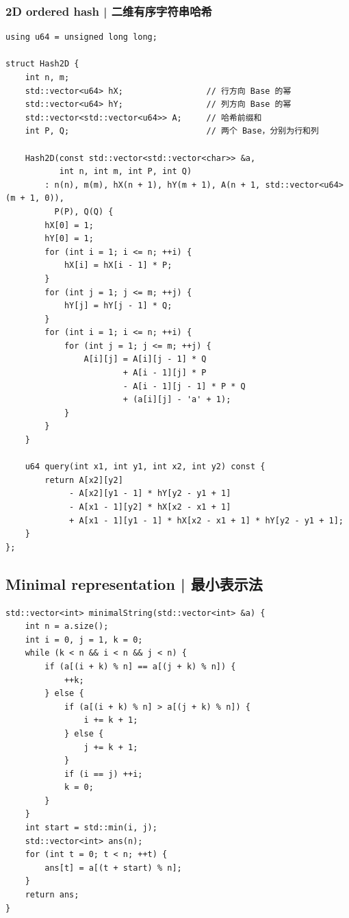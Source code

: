     \subsubsection{2D ordered hash | 二维有序字符串哈希}

        \begin{lstlisting}
using u64 = unsigned long long;

struct Hash2D {
    int n, m;
    std::vector<u64> hX;                 // 行方向 Base 的幂
    std::vector<u64> hY;                 // 列方向 Base 的幂
    std::vector<std::vector<u64>> A;     // 哈希前缀和
    int P, Q;                            // 两个 Base，分别为行和列

    Hash2D(const std::vector<std::vector<char>> &a,
           int n, int m, int P, int Q)
        : n(n), m(m), hX(n + 1), hY(m + 1), A(n + 1, std::vector<u64>(m + 1, 0)),
          P(P), Q(Q) {
        hX[0] = 1;
        hY[0] = 1;
        for (int i = 1; i <= n; ++i) {
            hX[i] = hX[i - 1] * P;
        }
        for (int j = 1; j <= m; ++j) {
            hY[j] = hY[j - 1] * Q;
        }
        for (int i = 1; i <= n; ++i) {
            for (int j = 1; j <= m; ++j) {
                A[i][j] = A[i][j - 1] * Q
                        + A[i - 1][j] * P
                        - A[i - 1][j - 1] * P * Q
                        + (a[i][j] - 'a' + 1);
            }
        }
    }

    u64 query(int x1, int y1, int x2, int y2) const {
        return A[x2][y2]
             - A[x2][y1 - 1] * hY[y2 - y1 + 1]
             - A[x1 - 1][y2] * hX[x2 - x1 + 1]
             + A[x1 - 1][y1 - 1] * hX[x2 - x1 + 1] * hY[y2 - y1 + 1];
    }
};
        \end{lstlisting}

\subsection{Minimal representation | 最小表示法}


    \begin{lstlisting}
std::vector<int> minimalString(std::vector<int> &a) {
    int n = a.size();
    int i = 0, j = 1, k = 0;
    while (k < n && i < n && j < n) {
        if (a[(i + k) % n] == a[(j + k) % n]) {
            ++k;
        } else {
            if (a[(i + k) % n] > a[(j + k) % n]) {
                i += k + 1;
            } else {
                j += k + 1;
            }
            if (i == j) ++i;
            k = 0;
        }
    }
    int start = std::min(i, j);
    std::vector<int> ans(n);
    for (int t = 0; t < n; ++t) {
        ans[t] = a[(t + start) % n];
    }
    return ans;
}
    \end{lstlisting}

